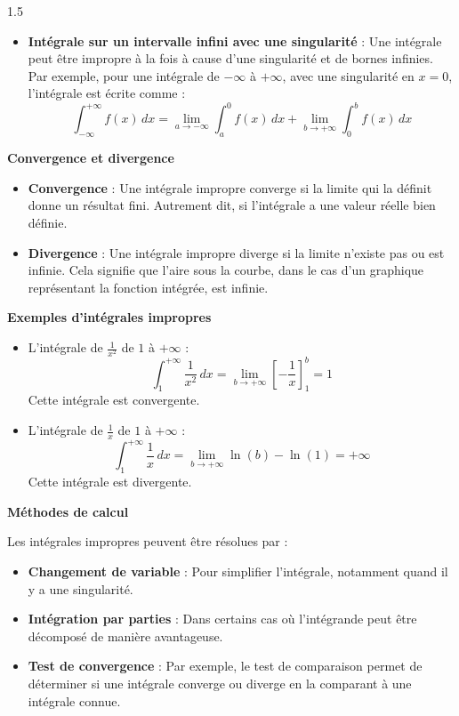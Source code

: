\documentclass[12pt]{article}
\begin{document}
\begin{spacing}{1.5}
\begin{itemize}
    \item \textbf{Intégrale sur un intervalle infini avec une singularité} : Une intégrale peut être impropre à la fois à cause d'une singularité et de bornes infinies. Par exemple, pour une intégrale de \( -\infty \) à \( +\infty \), avec une singularité en \( x = 0 \), l'intégrale est écrite comme :
    \[
    \int_{-\infty}^{+\infty} f(x) \, dx = \lim_{a \to -\infty} \int_a^0 f(x) \, dx + \lim_{b \to +\infty} \int_0^b f(x) \, dx
    \]
\end{itemize}

\textbf{ Convergence et divergence}

\begin{itemize}
    \item \textbf{Convergence} : Une intégrale impropre converge si la limite qui la définit donne un résultat fini. Autrement dit, si l'intégrale a une valeur réelle bien définie.
    
    \item \textbf{Divergence} : Une intégrale impropre diverge si la limite n'existe pas ou est infinie. Cela signifie que l'aire sous la courbe, dans le cas d'un graphique représentant la fonction intégrée, est infinie.
\end{itemize}

\textbf{ Exemples d'intégrales impropres}

\begin{itemize}
    \item L'intégrale de \( \frac{1}{x^2} \) de \( 1 \) à \( +\infty \) :
    \[
    \int_1^{+\infty} \frac{1}{x^2} \, dx = \lim_{b \to +\infty} \left[ -\frac{1}{x} \right]_1^b = 1
    \]
    Cette intégrale est convergente.
    
    \item L'intégrale de \( \frac{1}{x} \) de \( 1 \) à \( +\infty \) :
    \[
    \int_1^{+\infty} \frac{1}{x} \, dx = \lim_{b \to +\infty} \ln(b) - \ln(1) = +\infty
    \]
    Cette intégrale est divergente.
\end{itemize}

\textbf{ Méthodes de calcul}

Les intégrales impropres peuvent être résolues par :
\begin{itemize}
    \item \textbf{Changement de variable} : Pour simplifier l'intégrale, notamment quand il y a une singularité.
    \item \textbf{Intégration par parties} : Dans certains cas où l'intégrande peut être décomposé de manière avantageuse.
    \item \textbf{Test de convergence} : Par exemple, le test de comparaison permet de déterminer si une intégrale converge ou diverge en la comparant à une intégrale connue.
\end{itemize}


\end{spacing}
\end{document}
